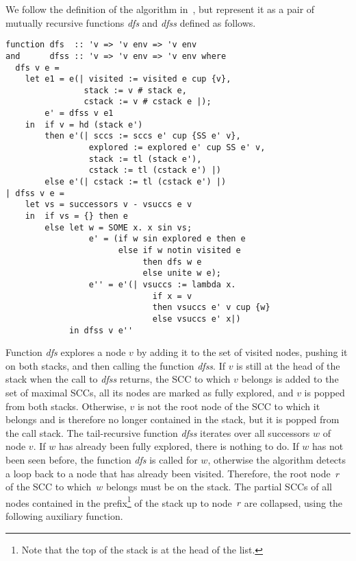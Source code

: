 \documentclass[sigplan,10pt,anonymous,review]{acmart}
\newcommand{\prog}[1]{\textit{#1}}
\begin{document}
We follow the definition of the algorithm in~\cite{bloemen:strong}, but represent it as a pair of mutually recursive functions \prog{dfs} and \prog{dfss} defined as follows.

\begin{small}
\begin{lstlisting}[language=isabelle]
function dfs  :: 'v => 'v env => 'v env
and      dfss :: 'v => 'v env => 'v env where
  dfs v e =
    let e1 = e(| visited := visited e cup {v},
                stack := v # stack e,
                cstack := v # cstack e |);
        e' = dfss v e1
    in  if v = hd (stack e')
        then e'(| sccs := sccs e' cup {SS e' v},
                 explored := explored e' cup SS e' v,
                 stack := tl (stack e'),
                 cstack := tl (cstack e') |)
        else e'(| cstack := tl (cstack e') |)
| dfss v e =
    let vs = successors v - vsuccs e v
    in  if vs = {} then e
        else let w = SOME x. x sin vs;
                 e' = (if w sin explored e then e
                       else if w notin visited e
                            then dfs w e
                            else unite w e);
                 e'' = e'(| vsuccs := lambda x. 
                              if x = v 
                              then vsuccs e' v cup {w}
                              else vsuccs e' x|)
             in dfss v e''
\end{lstlisting}
\end{small}

Function \prog{dfs} explores a node $v$ by adding it to the set of visited nodes, pushing it on both stacks, and then calling the function \prog{dfss}. If $v$ is still at the head of the stack when the call to \prog{dfss} returns, the SCC to which $v$ belongs is added to the set of maximal SCCs, all its nodes are marked as fully explored, and $v$ is popped from both stacks. Otherwise, $v$ is not the root node of the SCC to which it belongs and is therefore no longer contained in the stack, but it is popped from the call stack. The tail-recursive function \prog{dfss} iterates over all successors $w$ of node $v$. If $w$ has already been fully explored, there is nothing to do. If $w$ has not been seen before, the function \prog{dfs} is called for $w$, otherwise the algorithm detects a loop back to a node that has already been visited. Therefore, the root node~$r$ of the SCC to which~$w$ belongs must be on the stack. The partial SCCs of all nodes contained in the prefix\footnote{Note that the top of the stack is at the head of the list.} of the stack up to node~$r$ are collapsed, using the following auxiliary function.
\end{document}
